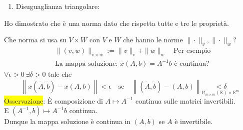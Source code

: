 \documentclass{article}
\begin{document}
\begin{enumerate}
\begin{align*}
\begin{pmatrix}
                                                                                                                                \vdots &       & \vdots \\
                                                                                                                                0      & \dots & 0
                                                                                                                            \end{pmatrix}\quad\checkmark
          \end{align*}

    \item Disuguaglianza triangolare:
\end{enumerate}
Ho dimostrato che è una norma dato che rispetta tutte e tre le proprietà.

Che norma si usa su $V\times W$ con $V$ e $W$ che hanno le norme $\|\cdot\|_v,\|\cdot\|_w$?
\begin{align*}
     & \|(v,w)\|_{v\times w}:=\|v\|_v+\|w\|_w\quad\text{Per esempio} \\
     & \text{La mappa soluzione: }x(A,b)=A^{-1}b \text{ è continua?}
\end{align*}
$\forall\epsilon>0\ \exists\delta>0$ tale che $$\left\|x\left(\widetilde{A},\widetilde{b}\right)-x\left(A,b\right)\right\|<\epsilon\quad\text{se}\quad\left\|\left(\widetilde{A},\widetilde{b}\right)-\left(A,b\right)\right\|\underset{\mathbb{M}_{m\times m}(\mathbb R)\times \mathbb R^m}{<\delta}$$
\colorbox{yellow}{Osservazione}: È composizione di $A\mapsto A^{-1}$ continua sulle matrici invertibili.\\
E $\left(A^{-1},b\right)\mapsto A^{-1}b$ continua.\\
Dunque la mappa soluzione è continua in $(A,b)$ se $A$ è invertibile.
\end{document}
